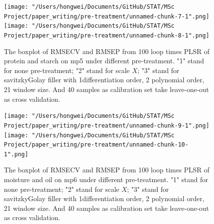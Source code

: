 \documentclass[a4paper,12pt,titlepage]{article} %
\numberwithin{equation}{section}  %
\begin{document}
\begin{appendices}
\begin{figure}[h]    %
	\centering           %
	\texttt{[image: "/Users/hongwei/Documents/GitHub/STAT/MSc Project/paper\_writing/pre-treatment/unnamed-chunk-7-1".png]}  %
	\texttt{[image: "/Users/hongwei/Documents/GitHub/STAT/MSc Project/paper\_writing/pre-treatment/unnamed-chunk-8-1".png]}  %
	\caption{The boxplot of RMSECV and RMSEP from 100 loop times PLSR of protein and starch on mp5 under different pre-treatment. "1" stand for none pre-treatment; "2" stand for scale $X$; "3" stand for savitzkyGolay filler with 1differentiation order, 2 polynomial order, 21 window size. And 40 samples as calibration set take leave-one-out as cross validation.}          %
	\label{fig:pre-treatment-7-1}               %
\end{figure}                        %

			\begin{figure}[h]    %
	\centering           %
	\texttt{[image: "/Users/hongwei/Documents/GitHub/STAT/MSc Project/paper\_writing/pre-treatment/unnamed-chunk-9-1".png]}  %
	\texttt{[image: "/Users/hongwei/Documents/GitHub/STAT/MSc Project/paper\_writing/pre-treatment/unnamed-chunk-10-1".png]}  %
	\caption{The boxplot of RMSECV and RMSEP from 100 loop times PLSR of moisture and oil on mp6 under different pre-treatment. "1" stand for none pre-treatment; "2" stand for scale $X$; "3" stand for savitzkyGolay filler with 1differentiation order, 2 polynomial order, 21 window size. And 40 samples as calibration set take leave-one-out as cross validation.}          %
	\label{fig:pretreatment-9-1}               %
\end{figure}                        %


\end{appendices}
\end{document}
